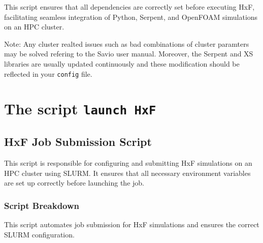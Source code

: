 \documentclass{article}
\begin{document}
This script ensures that all dependencies are correctly set before executing HxF, facilitating seamless integration of Python, Serpent, and OpenFOAM simulations on an HPC cluster.

Note: Any cluster realted issues such as bad combinations of cluster paramters may be solved refering to the Savio user manual. Moreover, the Serpent and XS libraries are usually updated continuously and these modification should be reflected in your \texttt{config} file.

\newpage
\section{The script \texttt{launch HxF}}\label{sec:launch}

\subsection{HxF Job Submission Script}
This script is responsible for configuring and submitting HxF simulations on an HPC cluster using SLURM. It ensures that all necessary environment variables are set up correctly before launching the job.

\subsubsection{Script Breakdown}
This script automates job submission for HxF simulations and ensures the correct SLURM configuration.
\end{document}
